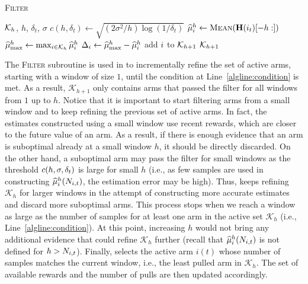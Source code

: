 \begin{algorithm}[t]
\caption{{\textsc{Filter}}}
\label{filter}
\begin{algorithmic}[1]
\Require $\mathcal{K}_{h}$, $h$, $\delta_t$, $\sigma$
\State $c(h, \delta_t) \leftarrow \sqrt{(2\sigma^2/h) \log{(1/\delta_t)}}$
\State $\widehat{\mu}_i^h \leftarrow \textsc{Mean}(\mathbf{H}(i_t)[-h:])$
\EndFor
\State $\widehat{\mu}^h_{\max}  \leftarrow \max_{i \in \mathcal{K}_{h}}\widehat{\mu}_i^h$
	\State $\Delta_i \leftarrow  \widehat{\mu}^h_{\max} - \widehat{\mu}^h_{i} $
	\State add $i$ to $\mathcal{K}_{h+1}$
	\EndIf
\EndFor
\Ensure $\mathcal{K}_{h+1}$
\end{algorithmic}
\end{algorithm}



The {\small\textsc{Filter}} subroutine is used in \myAlgorithm to incrementally refine the set of active arms, starting with a window of size $1$, until the condition at Line~\ref{algline:condition} is met. As a result, $\mathcal{K}_{h+1}$ only contains arms that passed the filter for all windows from $1$ up to $h$. Notice that it is important to start filtering arms from a small window and to keep refining the previous set of active arms. %
In fact, the estimates constructed using a small window use recent rewards, which are closer to the future value of an arm. As a result, if there is enough evidence that an arm is suboptimal already at a small window $h$, it should be directly discarded. On the other hand, a suboptimal arm may pass the filter for small windows as the threshold $c(h, \sigma, \delta_t)$ is large for small $h$ (i.e., as few samples are used in constructing $\widehat{\mu}^h_i(N_{i,t})$, the estimation error may be high). Thus, \myAlgorithm keeps refining $\mathcal{K}_{h}$ for larger windows in the attempt of constructing more accurate estimates and discard more suboptimal arms. This process stops when we reach a window as large as the number of samples for at least one arm in the active set $\mathcal{K}_{h}$ (i.e., Line~\ref{algline:condition}). At this point, increasing $h$ would not bring any additional evidence that could refine $\mathcal{K}_{h}$ further (recall that $\widehat{\mu}^h_i(N_{i,t})$ is not defined for $h > N_{i,t}$). Finally,  \myAlgorithm selects the active arm $i(t)$ whose number of samples matches the current window, i.e., the least pulled arm in $\mathcal{K}_{h}$. The set of available rewards and the number of pulls are then updated accordingly. 

